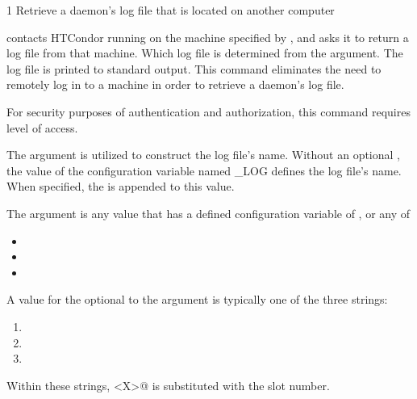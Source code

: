 \begin{ManPage}{\label{man-condor-fetchlog}}{1}
{Retrieve a daemon's log file that is located on another computer}

\Synopsis 
{}
\ToolArgsBase



\Description 

 contacts HTCondor running on the machine specified by
, and asks it to return a log file from that
machine.  Which log file is determined from
the  argument.
The log file is printed to standard output.
This command eliminates the need to remotely log in to a
machine in order to retrieve a daemon's log file.

For security purposes of authentication and authorization, 
this command requires  level of access.

The  argument is utilized to construct
the log file's name.
Without an optional ,
the value of the configuration variable named \_LOG 
defines the log file's name.
When specified, the  is appended to this value.

The  argument is any value 
that has a defined configuration variable of
, or any of
\begin{itemize}
\item {}
\item {}
\item {}
\end{itemize}

A value for the optional  to the  argument
is typically one of the three strings:
\begin{enumerate}
\item{}
\item{}
\item{}
\end{enumerate}
Within these strings, \verb@<X>@ is substituted with the slot number.
 

\end{ManPage}
